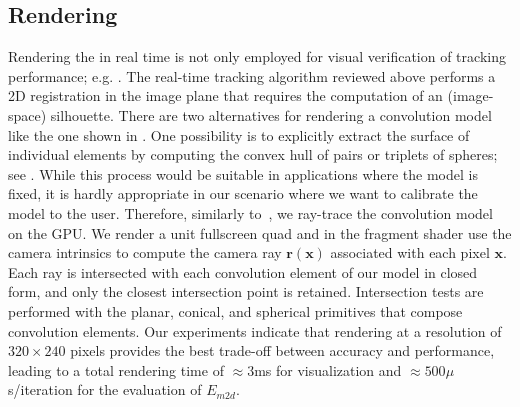 \subsection{Rendering}
\label{sec:rendering}
Rendering the  in real time is not only employed for visual verification of tracking performance; e.g. . The real-time tracking algorithm reviewed above performs a 2D registration in the image plane that requires the computation of an (image-space) silhouette. There are two alternatives for rendering a  convolution model like the one shown in . One possibility is to explicitly extract the surface of individual elements by computing the convex hull of pairs or triplets of spheres; see .
While this process would be suitable in applications where the model is fixed, it is hardly appropriate in our scenario where we want to calibrate the model to the user. Therefore, similarly to~\cite{thiery2016spheremesh}, we ray-trace the convolution model on the GPU. We render a unit fullscreen quad and in the fragment shader use the camera intrinsics to compute the camera ray $\mathbf{r}(\mathbf{x})$ associated with each pixel $\mathbf{x}$. Each ray is intersected with each convolution element of our model in closed form, and only the closest intersection point is retained. Intersection tests are performed with the planar, conical, and spherical primitives that compose convolution elements. 
% 
% 
Our experiments indicate that rendering at a resolution of $320 \times 240$ pixels provides the best trade-off between accuracy and performance, leading to a total rendering time of $\approx 3$ms for visualization and $\approx 500 \mu$s/iteration for the evaluation of $E_{m2d}$.

\endinput


